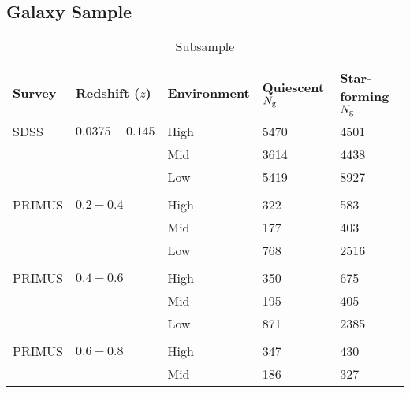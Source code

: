 \documentclass{emulateapj}
\begin{document}
\subsection{Galaxy Sample} \label{sec:target} 
\begin{table*} %
  \caption{Subsample}
  \label{tab:subsample}
  \begin{center}
    \leavevmode
    \begin{tabular}{lllll} \hline \hline              
  Survey    &Redshift ($z$) &Environment    &Quiescent $N_{\rm{g}}$ &Star-forming $N_{\rm{g}}$  \\ \hline 
  SDSS      &$0.0375-0.145$ &High           &5470                       &4501                           \\
            &               &Mid            &3614                       &4438                           \\
            &               &Low            &5419                       &8927                           \\
            &               &               &                       &                           \\ \hline
  PRIMUS    &$0.2-0.4$      &High           &322                    &583                           \\
            &               &Mid            &177                    &403                          \\
            &               &Low            &768                    &2516                           \\
            &               &               &                       &                           \\ \hline
  PRIMUS    &$0.4-0.6$      &High           &350                       &675                           \\
            &               &Mid            &195                       &405                           \\
            &               &Low            &871                       &2385                           \\
            &               &               &                       &                           \\ \hline
  PRIMUS    &$0.6-0.8$      &High           &347                       &430                           \\
            &               &Mid            &186                       &327                           \\

\end{tabular}
\end{center}
\end{table*}
\end{document}
